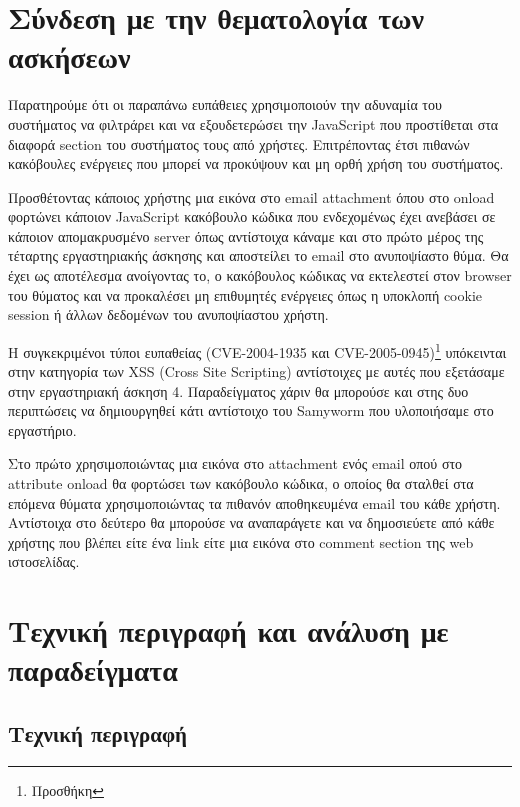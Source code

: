 %
%

\setcounter{section}{1}
\section{Σύνδεση με την θεματολογία των ασκήσεων}

\noindent
Παρατηρούμε ότι οι παραπάνω ευπάθειες χρησιμοποιούν την αδυναμία του συστήματος να φιλτράρει και να εξουδετερώσει την JavaScript που προστίθεται στα διαφορά section του συστήματος τους από χρήστες. Επιτρέποντας έτσι πιθανών κακόβουλες ενέργειες που μπορεί να προκύψουν και μη ορθή χρήση του συστήματος. 

\noindent
Προσθέτοντας κάποιος χρήστης μια εικόνα στο email attachment όπου στο onload φορτώνει κάποιον JavaScript κακόβουλο κώδικα που ενδεχομένως έχει ανεβάσει σε κάποιον απομακρυσμένο server όπως αντίστοιχα κάναμε και στο πρώτο μέρος της τέταρτης εργαστηριακής άσκησης και αποστείλει το email στο ανυποψίαστο θύμα. Θα έχει ως αποτέλεσμα ανοίγοντας το, ο κακόβουλος κώδικας να εκτελεστεί στον browser του θύματος και να προκαλέσει μη επιθυμητές ενέργειες όπως η υποκλοπή cookie session ή άλλων δεδομένων του ανυποψίαστου χρήστη. 

\noindent
Η συγκεκριμένοι τύποι ευπαθείας (CVE-2004-1935 και CVE-2005-0945)\footnote{Προσθήκη} υπόκεινται στην κατηγορία των XSS (Cross Site Scripting) αντίστοιχες με αυτές που εξετάσαμε στην εργαστηριακή άσκηση 4. Παραδείγματος χάριν θα μπορούσε και στης δυο περιπτώσεις να δημιουργηθεί κάτι αντίστοιχο του Samyworm που υλοποιήσαμε στο εργαστήριο. 

\noindent
Στο πρώτο χρησιμοποιώντας μια εικόνα στο attachment ενός email οπού στο attribute onload θα φορτώσει των κακόβουλο κώδικα, ο οποίος θα σταλθεί στα επόμενα θύματα χρησιμοποιώντας τα πιθανόν αποθηκευμένα email του κάθε χρήστη. Αντίστοιχα στο δεύτερο θα μπορούσε να αναπαράγετε και να δημοσιεύετε από κάθε χρήστης που βλέπει είτε ένα link είτε μια εικόνα στο comment section της web ιστοσελίδας. 




\section{Τεχνική περιγραφή και ανάλυση με παραδείγματα}

\subsection{Τεχνική περιγραφή}

